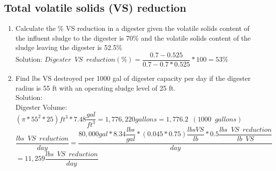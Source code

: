  \subsection{Total volatile solids (VS) reduction}    

                \begin{enumerate}
                    \item Calculate the \% VS reduction in a digester given the volatile solids content of the influent sludge to the digester is 70\% and the volatile solids content of the sludge leaving the digester is 52.5\%\\
                    Solution:  $Digester \enspace VS \enspace reduction (\%)=\dfrac{0.7-0.525}{0.7-0.7*0.525}*100=\boxed{ 53\%}$\\
                    \vspace{0.2cm}


                    \item Find lbs VS destroyed per 1000 gal of digester capacity per day if the digester radius is 55 ft with an operating sludge level of 25 ft.\\

                    \vspace{1cm}
                    Solution:\\
                    Digester Volume: 
                    $
                    {
                            (\pi*55^2*25)ft^3 *7.48 \dfrac{gal}{ft^3}
                        }=1,776,220 gallons=1,776.2 \enspace(1000 \enspace gallons)
                    $
                    \\
                    \vspace{3mm}
                    $
                        \dfrac
                        {
                        lbs \enspace VS \enspace reduction
                        }
                        {
                        day
                        }
                        =
                        \dfrac
                        {
                        80,000 gal * 8.34 \dfrac{lbs}{gal}*(0.045*0.75) \dfrac{lbs VS}{lb}*0.5\dfrac{lbs \enspace VS \enspace  reduction}{lb \enspace VS}
                        }
                        {
                        day
                        }$\\
                    \vspace{0.5cm}
                    $
                        =11,259
                        \dfrac
                        {
                        lbs \enspace VS \enspace reduction
                        }
                        {
                        day 
                        }
                    $
                    \\
                    \vspace{3mm}



\end{enumerate}
